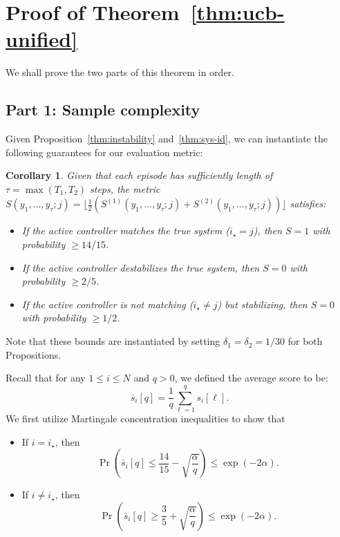 \documentclass[11pt, twoside]{article}
\newtheorem{corollary}[theorem]{Corollary}
\theoremstyle{definition}
\begin{document}
\section{Proof of Theorem~\ref{thm:ucb-unified}}
\label{sec:proof-ucb}
We shall prove the two parts of this theorem in order.


\subsection*{Part 1: Sample complexity}
Given Proposition~\ref{thm:instability} and~\ref{thm:sys-id}, we can instantiate the following guarantees for our evaluation metric:
\begin{corollary}
\label{thm:combined-metric}
    Given that each episode has sufficiently length of $\tau = \max(T_1, T_2)$ steps,
    the metric $S(y_1, \dots, y_\tau; j) = \lfloor \frac{1}{2} (S^{(1)}(y_1, \dots, y_\tau; j) + S^{(2)}(y_1, \dots, y_\tau; j)) \rfloor$ satisfies:
    \begin{itemize}[wide, labelindent=3pt]
    \item If the active controller matches the true system ($i_\star = j$), then $S = 1$ with probability $\ge 14/15$.
    \item If the active controller destabilizes the true system, then $S = 0$ with probability $\ge 2/5$.
    \item If the active controller is not matching ($i_\star \neq j$) but stabilizing, then $S = 0$ with probability $\ge 1/2$.
    \end{itemize}
\end{corollary}
Note that these bounds are instantiated by setting $\delta_1=\delta_2=1/30$ for both Propositions.


Recall that for any $1 \le i \le N$ and $q > 0$, we defined the average score to be:
\[\bar{s}_i[q] = \frac{1}{q} \sum_{\ell=1}^q s_i[\ell].\]
We first utilize Martingale concentration inequalities to show that
\begin{itemize}[wide, labelindent=3pt]
    \item If $i = i_\star$, then 
    \[ \Pr\left(\bar{s}_i[q] \le \frac{14}{15} - \sqrt{\frac{\alpha}{q}}\right) \le \exp(-2 \alpha).\]
    \item If $i \neq i_\star$, then 
    \[ \Pr\left(\bar{s}_i[q] \ge \frac{3}{5} + \sqrt{\frac{\alpha}{q}}\right) \le \exp(-2 \alpha).\]
\end{itemize}
\end{document}
